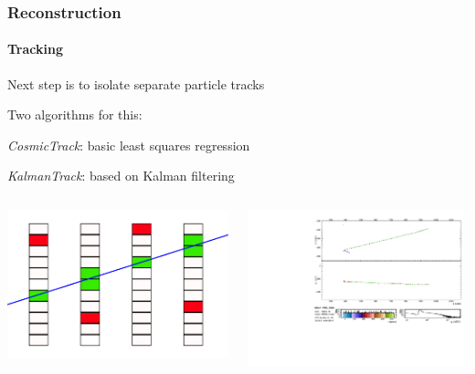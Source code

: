 \documentclass[10pt,professionalfonts,xcolor=table]{beamer}
\begin{document}
\begin{frame}
\begin{columns}[b]
\end{columns}

\end{frame}

\begin{frame}

\frametitle{Reconstruction}
\framesubtitle{Tracking}

\bangon
\item Next step is to isolate separate particle tracks
\gap
\item Two algorithms for this:
  \bangon
  \item \textit{CosmicTrack}: basic least squares regression
  \item \textit{KalmanTrack}: based on Kalman filtering
  \bangoff
\bangoff
\gap
\gap
\gap
\begin{columns}[c]
\centering
\includegraphics[width=\textwidth]{figures/figures/tracking.jpg}

\centering
\includegraphics[height=\textwidth, angle=-90]{figures/evd_steps/evd_track_zoom.pdf}


\end{columns}
\end{frame}
\end{document}
